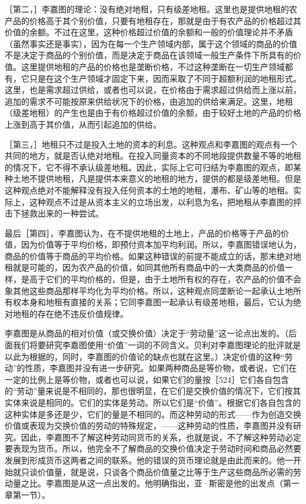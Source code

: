 ［第二，］李嘉图的理论：没有绝对地租，只有级差地租。这里也是提供地租的农产品的价格高于其个别价值，只要有地租存在，那就是由于有农产品的价格超过其价值的余额。不过在这里，这种价格超过价值的余额和一般的价值理论并不矛盾（虽然事实还是事实），因为在每一个生产领域内部，属于这个领域的商品的价值不是决定于商品的个别价值，而是决定于商品在该领域一般生产条件下所具有的价值。这里提供地租的产品的价格也是垄断价格，不过这种垄断在一切生产领域都有，它只是在这个生产领域才固定下来，因而采取了不同于超额利润的地租形式。这里，也是需求超过供给，或者也可以说，在价格由于需求超过供给而上涨以前，追加的需求不可能按原来供给状况下的价格，由追加的供给来满足。这里，地租（级差地租）的产生也是由于有价格超过价值的余额，由于较好土地的产品的价格上涨到高于其价值，从而引起追加的供给。

［第三，］地租只不过是投入土地的资本的利息。这种观点和李嘉图的观点有一个共同的地方，就是否认绝对地租。在投入同量资本的不同地段提供数量不等的地租的情况下，它不得不承认级差地租。因此，实际上它可归结为李嘉图的观点，即某种土地不提供地租，凡是提供本来意义的地租的地方，提供的都是级差地租。但是这种观点绝对不能解释没有投入任何资本的土地的地租，瀑布、矿山等的地租。实际上，这种观点不过是从资本主义的立场出发，以利息为名，把地租从李嘉图的抨击下拯救出来的一种尝试。

最后［第四］，李嘉图认为，在不提供地租的土地上，产品的价格等于产品的价值，因为价值等于平均价格，即预付资本加平均利润。所以，李嘉图错误地认为，商品的价值等于商品的平均价格。如果这种错误的前提不能成立的话，那末绝对地租就是可能的，因为农产品的价值，如同其他所有商品中的一大类商品的价值一样，是高于它们的平均价格的，但是，由于土地所有权的存在，农产品的价值不会象其他这些商品那样平均化为平均价格。所以，这种观点同垄断论一起承认土地所有权本身和地租有直接的关系；它同李嘉图一起承认有级差地租，最后，它认为绝对地租的存在绝不违反价值规律。


李嘉图是从商品的相对价值（或交换价值）决定于“劳动量”这一论点出发的。（后面我们将要研究李嘉图使用“价值”一词的不同含义。贝利对李嘉图理论的批评就是以此为根据的，同时，李嘉图的价值论的缺点也就在这里。）决定价值的这种“劳动”的性质，李嘉图并没有进一步研究。如果两种商品是等价物，或者说，它们在一定的比例上是等价物，或者也可以说，如果它们的量按［524］它们各自包含的“劳动”量来说是不相同的，那也很明显，在它们是交换价值的情况下，它们按其实体来说是相同的。它们的实体是劳动。所以它们是“价值”。根据它们各自包含的这种实体是多还是少，它们的量是不相同的。而这种劳动的形式——作为创造交换价值或表现为交换价值的劳动的特殊规定，——这种劳动的性质，李嘉图并没有研究。因此，李嘉图不了解这种劳动同货币的关系，也就是说，不了解这种劳动必定要表现为货币。所以，他完全不了解商品的交换价值决定于劳动时间和商品必然要发展到形成货币这两者之间的联系。他的错误的货币理论就是由此而来的。他一开始就只谈价值量，就是说，只谈各个商品价值量之比等于生产这些商品所必需的劳动量之比。李嘉图是从这一点出发的。他明确指出，亚·斯密是他的出发点（第一章第一节）。

